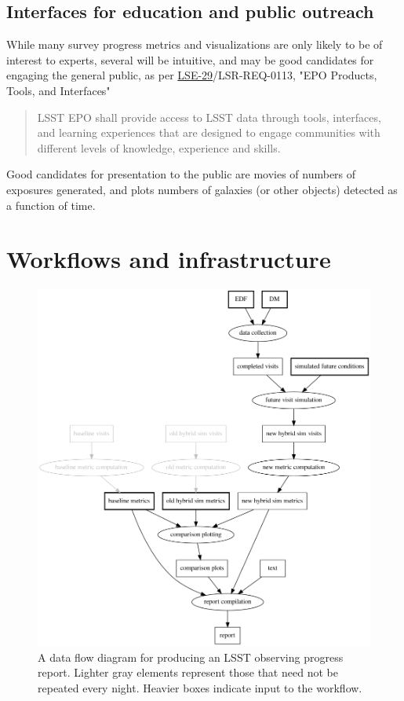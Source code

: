 \subsection{Interfaces for education and public outreach}
\label{sec:orgcc8dd0a}
While many survey progress metrics and visualizations are only likely to be of interest to experts, several will be intuitive, and may be good candidates for engaging the general public, as per \href{https://ls.st/lse-29}{LSE-29}/LSR-REQ-0113, "EPO Products, Tools, and Interfaces"
\begin{quote}
LSST EPO shall provide access to LSST data through tools, interfaces,
and learning experiences that are designed to engage communities with
different levels of knowledge, experience and skills.
\end{quote}
Good candidates for presentation to the public are movies of numbers of exposures generated, and plots numbers of galaxies (or other objects) detected as a function of time.
\section{Workflows and infrastructure}
\label{sec:org7812b66}
\begin{figure}[htbp]
\centering
\includegraphics[height=0.9\textheight]{./figures/reportdfd.png}
\caption{\label{fig:orgb4e43cd}A data flow diagram for producing an LSST observing progress report. Lighter gray elements represent those that need not be repeated every night. Heavier boxes indicate input to the workflow.}
\end{figure}

